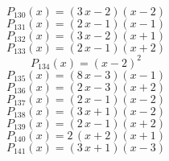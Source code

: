 \subitem \begin{dmath*}P_{130}(x) = {\left(3 \, x - 2\right)} {\left(x - 2\right)} \end{dmath*}\vspace{-1.2cm}
\subitem \begin{dmath*}P_{131}(x) = {\left(2 \, x - 1\right)} {\left(x - 1\right)} \end{dmath*}\vspace{-1.2cm}
\subitem \begin{dmath*}P_{132}(x) = {\left(3 \, x - 2\right)} {\left(x + 1\right)} \end{dmath*}\vspace{-1.2cm}
\subitem \begin{dmath*}P_{133}(x) = {\left(2 \, x - 1\right)} {\left(x + 2\right)} \end{dmath*}\vspace{-1.2cm}
\subitem \begin{dmath*}P_{134}(x) = {\left(x - 2\right)}^{2} \end{dmath*}\vspace{-1.2cm}
\subitem \begin{dmath*}P_{135}(x) = {\left(8 \, x - 3\right)} {\left(x - 1\right)} \end{dmath*}\vspace{-1.2cm}
\subitem \begin{dmath*}P_{136}(x) = {\left(2 \, x - 3\right)} {\left(x + 2\right)} \end{dmath*}\vspace{-1.2cm}
\subitem \begin{dmath*}P_{137}(x) = {\left(2 \, x - 1\right)} {\left(x - 2\right)} \end{dmath*}\vspace{-1.2cm}
\subitem \begin{dmath*}P_{138}(x) = {\left(3 \, x + 1\right)} {\left(x - 2\right)} \end{dmath*}\vspace{-1.2cm}
\subitem \begin{dmath*}P_{139}(x) = {\left(2 \, x - 1\right)} {\left(x + 2\right)} \end{dmath*}\vspace{-1.2cm}
\subitem \begin{dmath*}P_{140}(x) = 2 \, {\left(x + 2\right)} {\left(x + 1\right)} \end{dmath*}\vspace{-1.2cm}
\subitem \begin{dmath*}P_{141}(x) = {\left(3 \, x + 1\right)} {\left(x - 3\right)} \end{dmath*}\vspace{-1.2cm}
